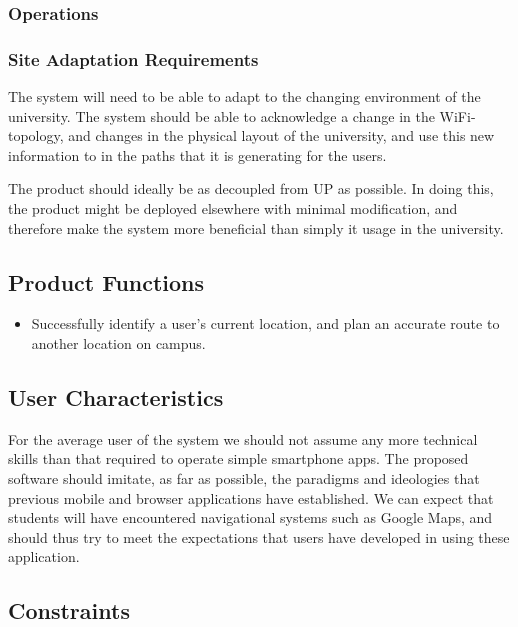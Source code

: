 \documentclass[12pt,a4paper]{article}
\begin{document}
			\subsubsection{Operations}



			\subsubsection{Site Adaptation Requirements}

				The system will need to be able to adapt to the changing environment of
				the university. The system should be able to acknowledge a change in the
				WiFi-topology, and changes in the physical layout of the university, and
				use this new information to in the paths that it is generating for the
				users.


				The product should ideally be as decoupled from UP as possible. In doing
				this, the product might be deployed elsewhere with minimal modification,
				and therefore make the system more beneficial than simply it usage in
				the university.


		\subsection{Product Functions}

			\begin{itemize}
				\item Successfully identify a user's current location, and plan an
							accurate route to another location on campus.
			\end{itemize}

		\subsection{User Characteristics}

			For the average user of the system we should not assume any more technical
			skills than that required to operate simple smartphone apps. The proposed
			software should imitate, as far as possible, the paradigms and ideologies
			that previous mobile and browser applications have established. We can
			expect that students will have encountered navigational systems such as
			Google Maps, and should thus try to meet the expectations that users have
			developed in using these application.

		\subsection{Constraints}
\end{document}
